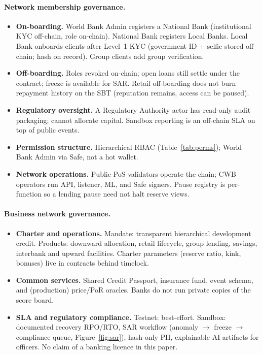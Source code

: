 \documentclass[11pt,a4paper]{article}
\begin{document}
\paragraph{Network membership governance.}
\begin{itemize}
  \item \textbf{On-boarding.} World Bank Admin registers a National Bank (institutional KYC off-chain, role on-chain). National Bank registers Local Banks. Local Bank onboards clients after Level~1 KYC (government ID + selfie stored off-chain; hash on record). Group clients add group verification.
  \item \textbf{Off-boarding.} Roles revoked on-chain; open loans still settle under the contract; freeze is available for SAR. Retail off-boarding does not burn repayment history on the SBT (reputation remains, access can be paused).
  \item \textbf{Regulatory oversight.} A Regulatory Authority actor has read-only audit packaging; cannot allocate capital. Sandbox reporting is an off-chain SLA on top of public events.
  \item \textbf{Permission structure.} Hierarchical RBAC (Table~\ref{tab:perms}); World Bank Admin via Safe, not a hot wallet.
  \item \textbf{Network operations.} Public PoS validators operate the chain; CWB operators run API, listener, ML, and Safe signers. Pause registry is per-function so a lending pause need not halt reserve views.
\end{itemize}

\paragraph{Business network governance.}
\begin{itemize}
  \item \textbf{Charter and operations.} Mandate: transparent hierarchical development credit. Products: downward allocation, retail lifecycle, group lending, savings, interbank and upward facilities. Charter parameters (reserve ratio, kink, bonuses) live in contracts behind timelock.
  \item \textbf{Common services.} Shared Credit Passport, insurance fund, event schema, and (production) price/PoR oracles. Banks do not run private copies of the score board.
  \item \textbf{SLA and regulatory compliance.} Testnet: best-effort. Sandbox: documented recovery RPO/RTO, SAR workflow (anomaly $\to$ freeze $\to$ compliance queue, Figure~\ref{fig:sar}), hash-only PII, explainable-AI artifacts for officers. No claim of a banking licence in this paper.
\end{itemize}
\end{document}
